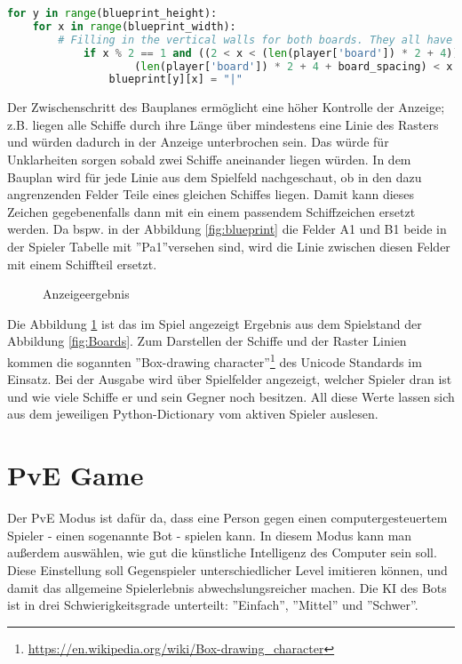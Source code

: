 \documentclass{article}
\begin{document}
\begin{lstlisting}[language=Python, caption =Beispiel zum Einfügen von bestimmten Teilen des Spielfeldrasters, label=lst:Grid example]
for y in range(blueprint_height):
    for x in range(blueprint_width):
        # Filling in the vertical walls for both boards. They all have odd x coordinate
            if x % 2 == 1 and ((2 < x < (len(player['board']) * 2 + 4)) or (
                    (len(player['board']) * 2 + 4 + board_spacing) < x < blueprint_width)):
                blueprint[y][x] = "|"
\end{lstlisting}

\par
    Der Zwischenschritt des Bauplanes ermöglicht eine höher Kontrolle der Anzeige; z.B. liegen alle Schiffe durch ihre Länge über mindestens eine Linie des Rasters und würden dadurch in der Anzeige unterbrochen sein. Das würde für Unklarheiten sorgen sobald zwei Schiffe aneinander liegen würden. In dem Bauplan wird für jede Linie aus dem Spielfeld nachgeschaut, ob in den dazu angrenzenden Felder Teile eines gleichen Schiffes liegen. Damit kann dieses Zeichen gegebenenfalls dann mit ein einem passendem Schiffzeichen ersetzt werden. Da bspw. in der Abbildung \ref{fig:blueprint} die Felder A1 und B1 beide in der Spieler Tabelle mit ''Pa1''versehen sind, wird die Linie zwischen diesen Felder mit einem Schiffteil ersetzt.

\begin{figure}[H]
    \centering
    
    \caption{Anzeigeergebnis}
    \label{fig:Result}
\end{figure}

    Die Abbildung \ref{fig:Result} ist das im Spiel angezeigt Ergebnis aus dem Spielstand der Abbildung \ref{fig:Boards}. Zum Darstellen der Schiffe und der Raster Linien kommen die sogannten ''Box-drawing character''\footnote{\url{https://en.wikipedia.org/wiki/Box-drawing_character}} des Unicode Standards im Einsatz. Bei der Ausgabe wird über Spielfelder angezeigt, welcher Spieler dran ist und wie viele Schiffe er und sein Gegner noch besitzen. All diese Werte lassen sich aus dem jeweiligen Python-Dictionary vom aktiven Spieler auslesen.


\section{PvE Game}
       Der PvE Modus ist dafür da, dass eine Person gegen einen computergesteuertem Spieler - einen sogenannte Bot - spielen kann. In diesem Modus kann man außerdem auswählen, wie gut die künstliche Intelligenz des Computer sein soll. Diese Einstellung soll Gegenspieler unterschiedlicher Level imitieren können, und damit das allgemeine Spielerlebnis abwechslungsreicher machen. Die KI des Bots ist in drei Schwierigkeitsgrade unterteilt: ''Einfach'', ''Mittel'' und ''Schwer''.
\end{document}
